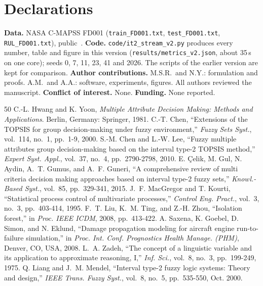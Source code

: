 \documentclass[journal,10pt,twocolumn]{IEEEtran}
\begin{document}
\section*{Declarations}
\textbf{Data.} NASA C-MAPSS FD001 (\texttt{train\_FD001.txt}, \texttt{test\_FD001.txt}, \texttt{RUL\_FD001.txt}), public~\cite{saxena2008}. \textbf{Code.} \texttt{code/it2\_stream\_v2.py} produces every number, table and figure in this version (\texttt{results/metrics\_v2.json}, about 35\,s on one core); seeds 0, 7, 11, 23, 41 and 2026. The scripts of the earlier version are kept for comparison. \textbf{Author contributions.} M.S.R.\ and N.Y.: formulation and proofs. A.M.\ and A.A.: software, experiments, figures. All authors reviewed the manuscript. \textbf{Conflict of interest.} None. \textbf{Funding.} None reported.

\begin{thebibliography}{50}
C.-L. Hwang and K. Yoon, \emph{Multiple Attribute Decision Making: Methods and Applications}. Berlin, Germany: Springer, 1981.
C.-T. Chen, ``Extensions of the TOPSIS for group decision-making under fuzzy environment,'' \emph{Fuzzy Sets Syst.}, vol.\ 114, no.\ 1, pp.\ 1-9, 2000.
S.-M. Chen and L.-W. Lee, ``Fuzzy multiple attributes group decision-making based on the interval type-2 TOPSIS method,'' \emph{Expert Syst. Appl.}, vol.\ 37, no.\ 4, pp.\ 2790-2798, 2010.
E. \c{C}elik, M. Gul, N. Aydin, A.~T. Gumus, and A.~F. Guneri, ``A comprehensive review of multi criteria decision making approaches based on interval type-2 fuzzy sets,'' \emph{Knowl.-Based Syst.}, vol.\ 85, pp.\ 329-341, 2015.
J.~F. MacGregor and T. Kourti, ``Statistical process control of multivariate processes,'' \emph{Control Eng. Pract.}, vol.\ 3, no.\ 3, pp.\ 403-414, 1995.
F.~T. Liu, K.~M. Ting, and Z.-H. Zhou, ``Isolation forest,'' in \emph{Proc. IEEE ICDM}, 2008, pp.\ 413-422.
A. Saxena, K. Goebel, D. Simon, and N. Eklund, ``Damage propagation modeling for aircraft engine run-to-failure simulation,'' in \emph{Proc. Int. Conf. Prognostics Health Manage. (PHM)}, Denver, CO, USA, 2008.
L.~A. Zadeh, ``The concept of a linguistic variable and its application to approximate reasoning, I,'' \emph{Inf. Sci.}, vol.\ 8, no.\ 3, pp.\ 199-249, 1975.
Q. Liang and J.~M. Mendel, ``Interval type-2 fuzzy logic systems: Theory and design,'' \emph{IEEE Trans. Fuzzy Syst.}, vol.\ 8, no.\ 5, pp.\ 535-550, Oct. 2000.

\end{thebibliography}
\end{document}
